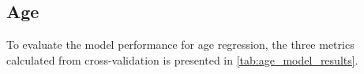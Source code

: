 
\subsection{Age}
To evaluate the model performance for age regression, the three metrics calculated from cross-validation is presented in \ref{tab:age_model_results}.

